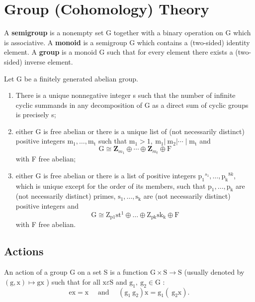 
\chapter{Group (Cohomology) Theory} 

A \textbf{semigroup} is a nonempty set G together with a binary operation on G which is associative. A \textbf{monoid} is a semigroup G which contains a (two-sided) identity element. A \textbf{group} is a monoid G such that for every element there exists a (two-sided) inverse element.

\begin{theo}
Let G be a finitely generated abelian group.
    \begin{enumerate}
        \item There is a unique nonnegative integer s such that the number of infinite cyclic summands in any decomposition of G as a direct sum of cyclic groups is precisely s;
        \item either G is free abelian or there is a unique list of (not necessarily distinct) positive integers $\mathrm{m}_1, \ldots, \mathrm{m}_{\mathrm{t}}$ such that $\mathrm{m}_1>1, \mathrm{~m}_1\left|\mathrm{~m}_2\right| \cdots \mid \mathrm{m}_{\mathrm{t}}$ and
        $$
        \mathrm{G} \cong \mathbf{Z}_{m_1} \oplus \cdots \oplus \mathbf{Z}_{m_t} \oplus \mathrm{F}
        $$
        with F free abelian;
        \item either G is free abelian or there is a list of positive integers $\mathrm{p}_1{ }^{s_1}, \ldots, \mathrm{p}_{\mathrm{k}}{ }^{8 k}$, which is unique except for the order of its members, such that $\mathrm{p}_1, \ldots, \mathrm{p}_{\mathrm{k}}$ are (not necessarily distinct) primes, $\mathrm{s}_1, \ldots, \mathrm{s}_{\mathrm{k}}$ are (not necessarily distinct) positive integers and
        $$
        \mathrm{G} \cong \mathrm{Z}_{\mathrm{p} 1} \mathrm{st}^1 \oplus \ldots \oplus \mathrm{Z}_{\mathrm{pk}} \mathrm{sk}_{\mathrm{k}} \oplus \mathrm{F}
        $$
        with F free abelian.
    \end{enumerate}
\end{theo}



\section{Actions}

An action of a group G on a set S is a function $\mathrm{G} \times \mathrm{S} \rightarrow \mathrm{S}$ (usually denoted by $(\mathrm{g}, \mathrm{x}) \mapsto \mathrm{gx}$ ) such that for all $\mathrm{x} \varepsilon \mathrm{S}$ and $\mathrm{g}_1, \mathrm{~g}_2 \in \mathrm{G}$ :
$$
\mathrm{ex}=\mathrm{x} \quad \text { and } \quad\left(\mathrm{g}_1 \mathrm{~g}_2\right) \mathrm{x}=\mathrm{g}_1\left(\mathrm{~g}_2 \mathrm{x}\right) .
$$

